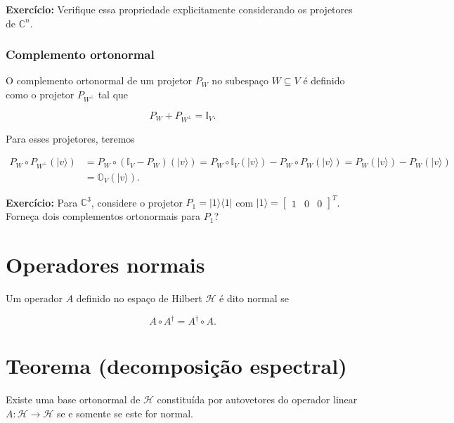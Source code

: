 \documentclass[11pt]{article}
\begin{document}
\textbf{Exercício:} Verifique essa propriedade explicitamente
considerando os projetores de \(\mathbb{C}^{n}\).

\subsubsection{Complemento ortonormal}\label{complemento-ortonormal}

O complemento ortonormal de um projetor \(P_{W}\) no subespaço
\(W\subseteq V\) é definido como o projetor \(P_{W^{\perp}}\) tal que

\begin{equation}
P_{W}+P_{W^{\perp}}=\mathbb{I}_{V}.
\end{equation}

Para esses projetores, teremos

\begin{align}
P_{W}\circ P_{W^{\perp}}(|v\rangle) & = P_{W}\circ(\mathbb{I}_{V}-P_{W})(|v\rangle) = P_{W}\circ\mathbb{I}_{V}(|v\rangle)-P_{W}\circ P_{W}(|v\rangle) = P_{W}(|v\rangle)-P_{W}(|v\rangle) \\ 
& = \mathbb{O}_{V}(|v\rangle).
\end{align}

\textbf{Exercício:} Para \(\mathbb{C}^{3}\), considere o projetor
\(P_{1}=|1\rangle\langle 1|\) com
\(|1\rangle=\begin{bmatrix} 1 & 0 & 0 \end{bmatrix}^{T}\). Forneça dois
complementos ortonormais para \(P_{1}\)?

    \section{Operadores normais}\label{operadores-normais}

Um operador \(A\) definido no espaço de Hilbert \(\mathcal{H}\) é dito
normal se

\begin{equation}
A\circ A^{\dagger} = A^{\dagger}\circ A.
\end{equation}

\section{Teorema (decomposição
espectral)}\label{teorema-decomposiuxe7uxe3o-espectral}

Existe uma base ortonormal de \(\mathcal{H}\) constituída por
autovetores do operador linear \(A:\mathcal{H}\rightarrow\mathcal{H}\)
se e somente se este for normal.
\end{document}
